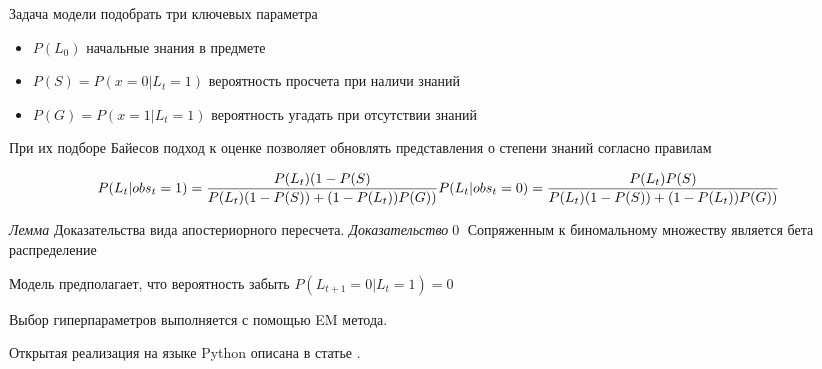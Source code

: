 Задача модели подобрать три ключевых параметра \begin{itemize}
    \item $P(L_0)$ начальные знания в предмете
    \item $P(S) = P(x=0| L_t = 1)$ вероятность просчета при наличи знаний
    \item  $P(G) = P(x=1| L_t = 1)$ вероятность угадать при отсутствии знаний
\end{itemize}

При их подборе Байесов подход к оценке
позволяет обновлять представления о
степени знаний согласно правилам

$$  
    P(L_t| obs_t=1) = \frac{P(L_t)(1-P(S)}{P(L_t)(1-P(S)) + (1-P(L_t))P(G))} \\
    P(L_t| obs_t=0) = \frac{P(L_t)P(S)}{P(L_t)(1-P(S)) + (1-P(L_t))P(G))} 
$$

\textit{Лемма} Доказательства вида апостериорного
 пересчета.
\textit{Доказательство}\qed
Сопряженным к биномальному множеству
является бета распределение 

Модель предполагает, что вероятность забыть $ P(L_{t+1}=0|L_t=1)=0$

\blacksquare

Выбор гиперпараметров выполняется с помощью EM метода.







Открытая реализация на языке Python описана в статье \cite{badrinath2021pybkt}.




